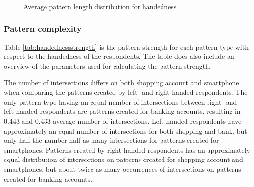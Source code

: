       \begin{figure}[H]
      	\centering
      	\caption{Average pattern length distribution for handedness}
      	\label{fig:avgpatterndisthandedness}
      \end{figure}

    \subsubsection{Pattern complexity}
    Table \ref{tab:handednessstrength} is the pattern strength for each pattern type with respect to the handedness of the respondents. The table does also include an overview of the parameters used for calculating the pattern strength. 

    The number of intersections differs on both shopping account and smartphone when comparing the patterns created by left- and right-handed respondents. The only pattern type having an equal number of intersections between right- and left-handed respondents are patterns created for banking accounts, resulting in 0.443 and 0.433 average number of intersections. Left-handed respondents have approximately an equal number of intersections for both shopping and bank, but only half the number half as many intersections for patterns created for smartphones. Patterns created by right-handed respondents has an approximately equal distribution of intersections on patterns created for shopping account and smartphones, but about twice as many occurrences of intersections on patterns created for banking accounts.

